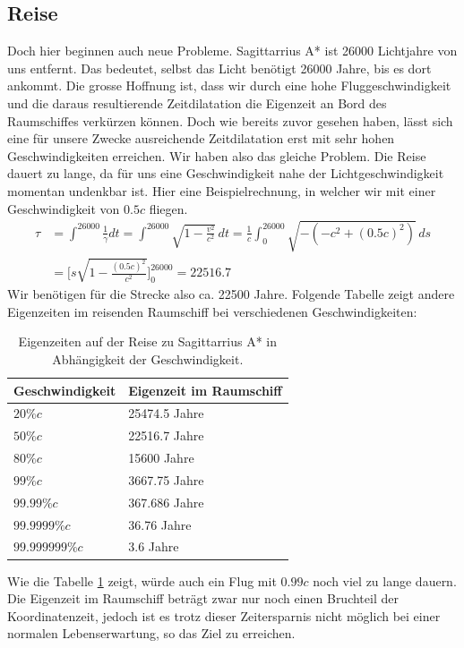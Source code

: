\begin{refsection}
    \subsection{Reise}
    Doch hier beginnen auch neue Probleme. Sagittarrius A* ist 26000 Lichtjahre von uns entfernt. Das bedeutet, selbst das Licht benötigt 26000 Jahre, bis es dort ankommt. Die grosse Hoffnung ist, dass wir durch eine hohe Fluggeschwindigkeit und die daraus resultierende Zeitdilatation die Eigenzeit an Bord des Raumschiffes verkürzen können. 
    Doch wie bereits zuvor gesehen haben, lässt sich eine für unsere Zwecke ausreichende Zeitdilatation erst mit sehr hohen Geschwindigkeiten erreichen. Wir haben also das gleiche Problem. Die Reise dauert zu lange, da für uns eine Geschwindigkeit nahe der Lichtgeschwindigkeit momentan undenkbar ist.
    Hier eine Beispielrechnung, in welcher wir mit einer Geschwindigkeit von $0.5c$ fliegen.
	\begin{align*}
	\tau
	&= 
	\int_{}^{26000}\frac{1}{\gamma}dt=\int_{}^{26000}\sqrt{1-\frac{v^2}{c^2}}\,dt
	= 
	\frac{1}{c}\int_{0}^{26000}\sqrt{-(-c^2+(0.5c)^2)}\,ds\\
	&=
	\biggl[s\sqrt{1-\frac{(0.5c)^{2}}{c^2}}\biggr]_0^{26000}
	=
	22516.7
	\end{align*}
	Wir benötigen für die Strecke also ca. 22500 Jahre.
	Folgende Tabelle zeigt andere Eigenzeiten im reisenden Raumschiff bei verschiedenen Geschwindigkeiten:
    \begin{table}[H]
         \begin{center}
            \begin{tabular}{ | l | l |}
            \hline
            Geschwindigkeit & Eigenzeit im Raumschiff \\ \hline
            $20\%c$ & 25474.5 Jahre \\ 
            $50\%c$ & 22516.7 Jahre \\
            $80\%c$ & 15600 Jahre \\ 
            $99\%c$ & 3667.75 Jahre \\ 
            $99.99\%c$ & 367.686 Jahre \\ 
            $99.9999\%c$ & 36.76 Jahre \\ 
            $99.999999\%c$ & 3.6 Jahre \\ \hline
             \end{tabular}
        \end{center}
    \caption{Eigenzeiten auf der Reise zu Sagittarrius A* in Abhängigkeit der Geschwindigkeit.}
    \label{table:eigenzeiten}
    \end{table}
    \noindent
	Wie die Tabelle \ref{table:eigenzeiten} zeigt, würde auch ein Flug mit $0.99c$ noch viel zu lange dauern. 
	Die Eigenzeit im Raumschiff beträgt zwar nur noch einen Bruchteil der Koordinatenzeit, jedoch ist es trotz dieser Zeitersparnis nicht möglich bei einer normalen Lebenserwartung, so das Ziel zu erreichen.
    

\end{refsection}
